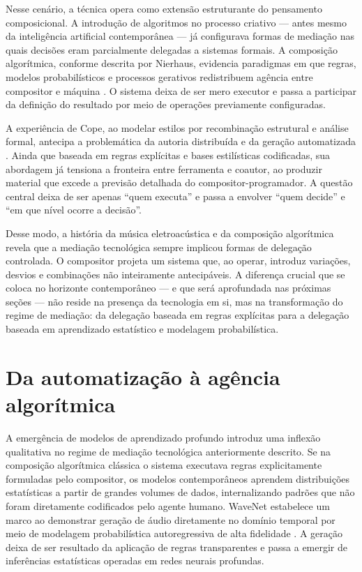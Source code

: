 Nesse cenário, a técnica opera como extensão estruturante do pensamento composicional. A introdução de algoritmos no processo criativo — antes mesmo da inteligência artificial contemporânea — já configurava formas de mediação nas quais decisões eram parcialmente delegadas a sistemas formais. A composição algorítmica, conforme descrita por Nierhaus, evidencia paradigmas em que regras, modelos probabilísticos e processos gerativos redistribuem agência entre compositor e máquina \cite{nierhaus2009algorithmiccomposition}. O sistema deixa de ser mero executor e passa a participar da definição do resultado por meio de operações previamente configuradas.

A experiência de Cope, ao modelar estilos por recombinação estrutural e análise formal, antecipa a problemática da autoria distribuída e da geração automatizada \cite{cope1996emi}. Ainda que baseada em regras explícitas e bases estilísticas codificadas, sua abordagem já tensiona a fronteira entre ferramenta e coautor, ao produzir material que excede a previsão detalhada do compositor-programador. A questão central deixa de ser apenas “quem executa” e passa a envolver “quem decide” e “em que nível ocorre a decisão”.

Desse modo, a história da música eletroacústica e da composição algorítmica revela que a mediação tecnológica sempre implicou formas de delegação controlada. O compositor projeta um sistema que, ao operar, introduz variações, desvios e combinações não inteiramente antecipáveis. A diferença crucial que se coloca no horizonte contemporâneo — e que será aprofundada nas próximas seções — não reside na presença da tecnologia em si, mas na transformação do regime de mediação: da delegação baseada em regras explícitas para a delegação baseada em aprendizado estatístico e modelagem probabilística.


\section{Da automatização à agência algorítmica}

A emergência de modelos de aprendizado profundo introduz uma inflexão qualitativa no regime de mediação tecnológica anteriormente descrito. Se na composição algorítmica clássica o sistema executava regras explicitamente formuladas pelo compositor, os modelos contemporâneos aprendem distribuições estatísticas a partir de grandes volumes de dados, internalizando padrões que não foram diretamente codificados pelo agente humano. WaveNet estabelece um marco ao demonstrar geração de áudio diretamente no domínio temporal por meio de modelagem probabilística autoregressiva de alta fidelidade \cite{oord2016wavenet}. A geração deixa de ser resultado da aplicação de regras transparentes e passa a emergir de inferências estatísticas operadas em redes neurais profundas.

